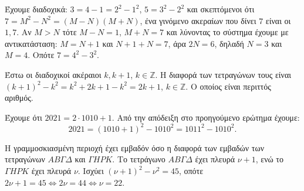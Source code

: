 
\begin{alist}
\item Έχουμε διαδοχικά: $3 = 4 - 1 = 2^2 - 1^2$, $5 = 3^2 - 2^2$ και σκεπτόμενοι ότι
$7 = M^2 - N^2 = (M - N)(M + N)$, ένα γινόμενο ακεραίων που δίνει $7$ είναι οι $1, 7$.
Αν $M > N$ τότε $M - N = 1$, $M + N = 7$ και λύνοντας το σύστημα έχουμε με αντικατάσταση:
$M = N + 1$ και $N + 1 + N = 7$, άρα $2N = 6$, δηλαδή $N = 3$ και $M = 4$.
Οπότε $7 = 4^2 - 3^2$.

\item
\begin{rlist}
\item Έστω οι διαδοχικοί ακέραιοι $k, k+1$, $k \in \mathbb{Z}$.
Η διαφορά των τετραγώνων τους είναι $(k + 1)^2 - k^2 = k^2 + 2k + 1 - k^2 = 2k + 1$, $k \in \mathbb{Z}$.
Ο οποίος είναι περιττός αριθμός.
\item Έχουμε ότι $2021 = 2 \cdot 1010 + 1$.
Από την απόδειξη στο προηγούμενο ερώτημα έχουμε:
\[2021 = (1010 + 1)^2 - 1010^2 = 1011^2 - 1010^2.\]
\end{rlist}

\item Η γραμμοσκιασμένη περιοχή έχει εμβαδόν όσο η διαφορά των εμβαδών των τετραγώνων
$AB\Gamma\Delta$ και $\Gamma HPK$.
Το τετράγωνο $AB\Gamma\Delta$ έχει πλευρά $\nu+1$, ενώ το $\Gamma HPK$ έχει πλευρά $\nu$.
Ισχύει $(\nu + 1)^2 - \nu^2 = 45$, οπότε $2\nu + 1 = 45 \Leftrightarrow 2\nu = 44 \Leftrightarrow \nu = 22$.
\end{alist}

